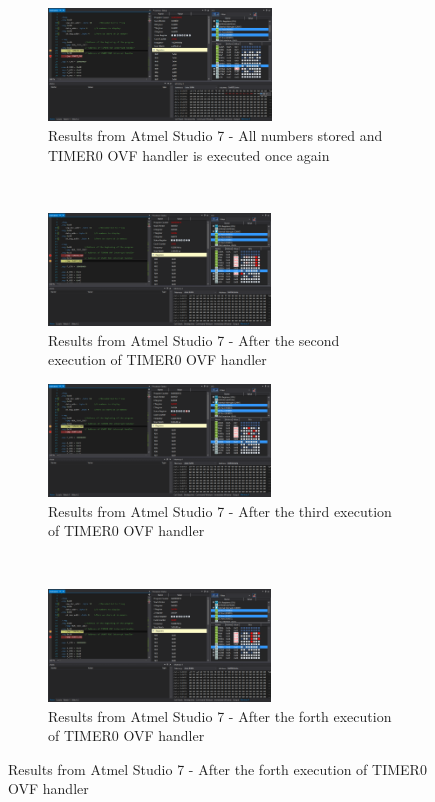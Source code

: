 \documentclass{article}
\begin{document}
\begin{figure}[h!]
		\begin{subfigure}[t]{0.5\textwidth}
			\centering
			\includegraphics[height=3cm, width=\textwidth]{./results/lab3_num_instr_d.png}
			\caption{Results from Αtmel Studio 7 - All numbers stored and TIMER0 OVF handler is executed once again}
		\end{subfigure}%
		~
		\begin{subfigure}[t]{0.5\textwidth}
			\centering
			\includegraphics[height=3cm, width=\textwidth]{./results/lab3_num_instr_e.png}
			\caption{Results from Αtmel Studio 7 - After the second execution of TIMER0 OVF handler}
		\end{subfigure}	
		
		\begin{subfigure}[t]{0.5\textwidth}
			\centering
			\includegraphics[height=3cm, width=\linewidth]{./results/lab3_num_instr_f.png}
			\caption{Results from Αtmel Studio 7 - After the third execution of TIMER0 OVF handler}
		\end{subfigure}%
		~
		\begin{subfigure}[t]{0.5\textwidth}
			\centering
			\includegraphics[height=3cm, width=\linewidth]{./results/lab3_num_instr_g.png}
			\caption{Results from Αtmel Studio 7 - After the forth execution of TIMER0 OVF handler}
		\end{subfigure}	
	\end{figure}
\end{document}
